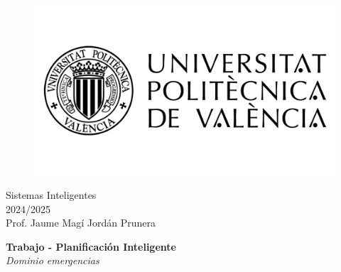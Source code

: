 \begin{titlepage}
   \begin{figure}
      \vspace{50mm}
       \centering
       \includegraphics[keepaspectratio=true,width=0.40\columnwidth]{images/upvLogo.png}
   \end{figure}
   
   \vspace{40mm}
   \begin{center}
       \LARGE{Sistemas Inteligentes}
       \vspace{2.5mm}
       \\ \large{2024/2025}
       \vspace{5mm}
       \\ \large{Prof. Jaume Magí Jordán Prunera}
   \end{center}
   
   \begin{center}
      \vspace{10mm}
       {\LARGE{\textbf{Trabajo - Planificación Inteligente}\\ \vspace{5mm}
       \textit{Dominio emergencias}}}
       
   \end{center}
\end{titlepage}